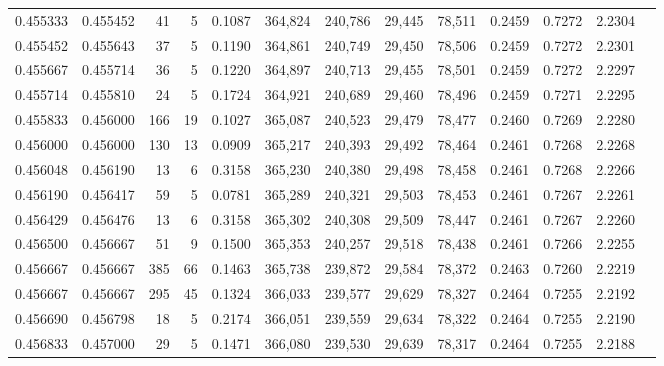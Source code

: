 \begin{tabular}{rrrrrrrrrrrrr}
0.455333 & 0.455452 &    41 &   5 &                                     0.1087 & 364,824 & 240,786 &  29,445 &  78,511 & 0.2459 & 0.7272 & 2.2304 \\
0.455452 & 0.455643 &    37 &   5 &                                     0.1190 & 364,861 & 240,749 &  29,450 &  78,506 & 0.2459 & 0.7272 & 2.2301 \\
0.455667 & 0.455714 &    36 &   5 &                                     0.1220 & 364,897 & 240,713 &  29,455 &  78,501 & 0.2459 & 0.7272 & 2.2297 \\
0.455714 & 0.455810 &    24 &   5 &                                     0.1724 & 364,921 & 240,689 &  29,460 &  78,496 & 0.2459 & 0.7271 & 2.2295 \\
0.455833 & 0.456000 &   166 &  19 &                                     0.1027 & 365,087 & 240,523 &  29,479 &  78,477 & 0.2460 & 0.7269 & 2.2280 \\
0.456000 & 0.456000 &   130 &  13 &                                     0.0909 & 365,217 & 240,393 &  29,492 &  78,464 & 0.2461 & 0.7268 & 2.2268 \\
0.456048 & 0.456190 &    13 &   6 &                                     0.3158 & 365,230 & 240,380 &  29,498 &  78,458 & 0.2461 & 0.7268 & 2.2266 \\
0.456190 & 0.456417 &    59 &   5 &                                     0.0781 & 365,289 & 240,321 &  29,503 &  78,453 & 0.2461 & 0.7267 & 2.2261 \\
0.456429 & 0.456476 &    13 &   6 &                                     0.3158 & 365,302 & 240,308 &  29,509 &  78,447 & 0.2461 & 0.7267 & 2.2260 \\
0.456500 & 0.456667 &    51 &   9 &                                     0.1500 & 365,353 & 240,257 &  29,518 &  78,438 & 0.2461 & 0.7266 & 2.2255 \\
0.456667 & 0.456667 &   385 &  66 &                                     0.1463 & 365,738 & 239,872 &  29,584 &  78,372 & 0.2463 & 0.7260 & 2.2219 \\
0.456667 & 0.456667 &   295 &  45 &                                     0.1324 & 366,033 & 239,577 &  29,629 &  78,327 & 0.2464 & 0.7255 & 2.2192 \\
0.456690 & 0.456798 &    18 &   5 &                                     0.2174 & 366,051 & 239,559 &  29,634 &  78,322 & 0.2464 & 0.7255 & 2.2190 \\
0.456833 & 0.457000 &    29 &   5 &                                     0.1471 & 366,080 & 239,530 &  29,639 &  78,317 & 0.2464 & 0.7255 & 2.2188 \\

\end{tabular}
